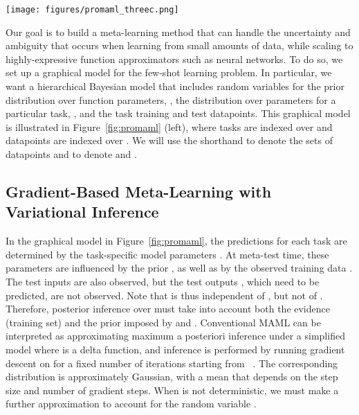 \documentclass{article}
\begin{document}
\begin{figure*}[t] \centering
    \texttt{[image: figures/promaml\_threec.png]}
    \vspace{-0.3cm}
    \caption{\label{fig:promaml} \small Graphical models corresponding to our approach. The original graphical model (left) is transformed into the center model after performing inference over . We find it beneficial to introduce additional dependencies of the prior on the training data to compensate for using the MAP estimate to approximate , as shown on the right.}
    \vspace{-0.2cm}
\end{figure*}
Our goal is to build a meta-learning method that can handle the uncertainty and ambiguity that occurs when learning from small amounts of data, while scaling to highly-expressive function approximators such as neural networks. To do so, we set up a graphical model for the few-shot learning problem. In particular, we want a hierarchical Bayesian model that includes random variables for the prior distribution over function parameters, , the distribution over parameters for a particular task, , and the task training and test datapoints.  This graphical model is illustrated in Figure~\ref{fig:promaml} (left), where tasks are indexed over  and datapoints are indexed over .
We will use the shorthand  to denote the sets of datapoints  and  to denote  and .


\vspace{-0.2cm}
\subsection{Gradient-Based Meta-Learning with Variational Inference}
\vspace{-0.2cm}

In the graphical model in Figure~\ref{fig:promaml}, the predictions for each task are determined by the task-specific model parameters . At meta-test time, these parameters are influenced by the prior , as well as by the observed training data . The test inputs  are also observed, but the test outputs , which need to be predicted, are not observed. Note that  is thus independent of , but not of . Therefore, posterior inference over  must take into account both the evidence (training set) and the prior imposed by  and . Conventional MAML can be interpreted as approximating maximum a posteriori inference under a simplified model where  is a delta function, and inference is performed by running gradient descent on  for a fixed number of iterations starting from ~\cite{grant2018recasting}. The corresponding distribution  is approximately Gaussian, with a mean that depends on the step size and number of gradient steps. When  is not deterministic, we must make a further approximation to account for the random variable .
\end{document}
